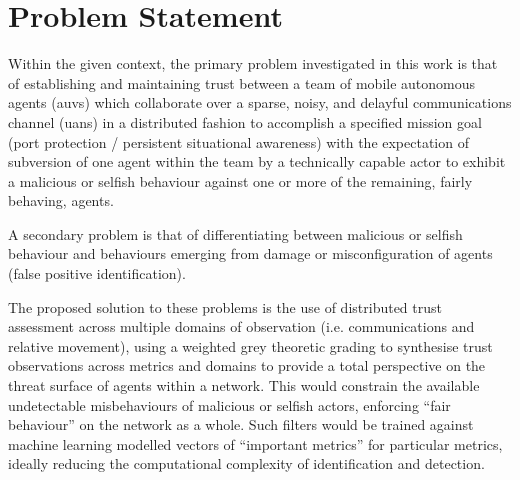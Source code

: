 \pagebreak
\section{Problem Statement}\label{sec:problem}

Within the given context, the primary problem investigated in this work is that of establishing and maintaining trust between a team of mobile autonomous agents (\glspl{auv}) which collaborate over a sparse, noisy, and delayful communications channel (\glspl{uan}) in a distributed fashion to accomplish a specified mission goal (port protection / persistent situational awareness) with the expectation of subversion of one agent within the team by a technically capable actor to exhibit a malicious or selfish behaviour against one or more of the remaining, fairly behaving, agents. 

A secondary problem is that of differentiating between malicious or selfish behaviour and behaviours emerging from damage or misconfiguration of agents (false positive identification).

The proposed solution to these problems is the use of distributed trust assessment across multiple domains of observation (i.e. communications and relative movement), using a weighted grey theoretic grading to synthesise trust observations across metrics and domains to provide a total perspective on the threat surface of agents within a network.
This would constrain the available undetectable misbehaviours of malicious or selfish actors, enforcing ``fair behaviour'' on the network as a whole.
Such filters would be trained against machine learning modelled vectors of ``important metrics'' for particular metrics, ideally reducing the computational complexity of identification and detection. 

